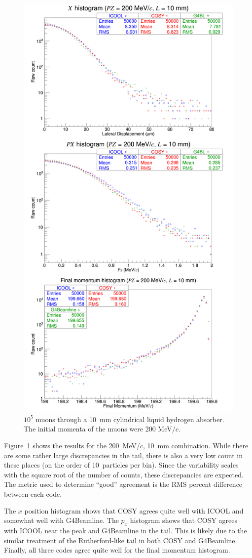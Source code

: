 \documentclass[a4paper,11pt]{article}
\begin{document}
\begin{figure}[H]
  \centering
    \includegraphics[width=0.7\columnwidth]{Figures/benchmarking.200.10} 
  \caption{$10^5$ muons through a 10~mm cylindrical liquid hydrogen absorber. The initial momenta of the muons were 200 MeV/$c$.}
  \label{fig:benchmarking.100.1}
\end{figure}

Figure~\ref{fig:benchmarking.100.1} shows the results for the 200~MeV/$c$, 10~mm combination. While there are some rather large discrepancies in the tail, there is also a very low count in these places (on the order of 10~particles per bin). Since the variability scales with the square root of the number of counts, these discrepancies are expected. The metric used to determine ``good'' agreement is the RMS percent difference between each code.

The $x$ position histogram shows that COSY agrees quite well with ICOOL and somewhat well with G4Beamline. The $p_x$ histogram shows that COSY agrees with ICOOL near the peak and G4Beamline in the tail. This is likely due to the similar treatment of the Rutherford-like tail in both COSY and G4Beamline. Finally, all three codes agree quite well for the final momentum histogram.
\end{document}
